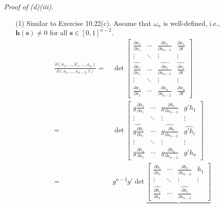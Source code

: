 \documentclass{article}
\begin{document}
\emph{Proof of (d)(iii).}
\begin{enumerate}
\item[(1)]
  Similar to Exercise 10.22(c).
  Assume that $\omega_n$ is well-defined, i.e., $\mathbf{h}(\mathbf{s}) \neq 0$
  for all $\mathbf{s} \in [0,1]^{n-2}$.
  \begin{align*}
    \frac{\partial(x_1,\ldots,\widehat{x_i},\ldots,x_n)}
      {\partial(s_1,\ldots,s_{n-2},t)}
    =& \:
    \det
    \begin{bmatrix}
      \frac{\partial x_1}{\partial s_1}
        & \cdots
        & \frac{\partial x_1}{\partial s_{n-2}}
        & \frac{\partial x_1}{\partial t} \\
      \vdots & \ddots & \vdots & \vdots \\
      \widehat{\frac{\partial x_i}{\partial s_1}}
        & \cdots
        & \widehat{\frac{\partial x_i}{\partial s_{n-2}}}
        & \widehat{\frac{\partial x_i}{\partial t}} \\
      \vdots & \ddots & \vdots & \vdots \\
      \frac{\partial x_1}{\partial s_1}
        & \cdots
        & \frac{\partial x_n}{\partial s_{n-2}}
        & \frac{\partial x_n}{\partial t}
    \end{bmatrix} \\
    =& \:
    \det
    \begin{bmatrix}
      g \frac{\partial h_1}{\partial s_1}
        & \cdots
        & g \frac{\partial h_1}{\partial s_{n-2}}
        & g' h_1 \\
      \vdots & \ddots & \vdots & \vdots \\
      \widehat{g \frac{\partial h_i}{\partial s_1}}
        & \cdots
        & \widehat{g \frac{\partial h_i}{\partial s_{n-2}}}
        & \widehat{g' h_i} \\
      \vdots & \ddots & \vdots & \vdots \\
      g \frac{\partial h_n}{\partial s_1}
        & \cdots
        & g \frac{\partial h_n}{\partial s_{n-2}}
        & g' h_n
    \end{bmatrix} \\
    =& \:
    g^{n-2} g' \det
    \underbrace{\begin{bmatrix}
      \frac{\partial h_1}{\partial s_1}
        & \cdots
        & \frac{\partial h_1}{\partial s_{n-2}}
        & h_1 \\
      \vdots & \ddots & \vdots & \vdots \\
      \widehat{\frac{\partial h_i}{\partial s_1}}
        & \cdots
        & \widehat{\frac{\partial h_i}{\partial s_{n-2}}}

\end{bmatrix}}
\end{align*}
\end{enumerate}
\end{document}
